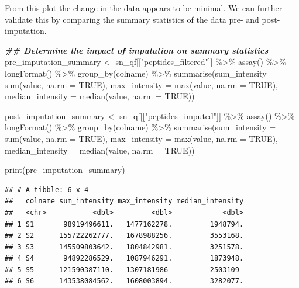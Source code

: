 \documentclass[9pt,a4paper,]{extarticle}
\newenvironment{Shaded}{\begin{snugshade}}{\end{snugshade}}
\newcommand{\AttributeTok}[1]{\textcolor[rgb]{0.77,0.63,0.00}{#1}}
\newcommand{\ConstantTok}[1]{\textcolor[rgb]{0.00,0.00,0.00}{#1}}
\newcommand{\DocumentationTok}[1]{\textcolor[rgb]{0.56,0.35,0.01}{\textbf{\textit{#1}}}}
\newcommand{\FunctionTok}[1]{\textcolor[rgb]{0.00,0.00,0.00}{#1}}
\newcommand{\NormalTok}[1]{#1}
\newcommand{\OtherTok}[1]{\textcolor[rgb]{0.56,0.35,0.01}{#1}}
\newcommand{\SpecialCharTok}[1]{\textcolor[rgb]{0.00,0.00,0.00}{#1}}
\newcommand{\StringTok}[1]{\textcolor[rgb]{0.31,0.60,0.02}{#1}}
\begin{document}
From this plot the change in the data appears to be minimal. We can further
validate this by comparing the summary statistics of the data pre- and post-
imputation.

\begin{Shaded}
\begin{Highlighting}[]
\DocumentationTok{\#\# Determine the impact of imputation on summary statistics}
\NormalTok{pre\_imputation\_summary }\OtherTok{\textless{}{-}}\NormalTok{ sn\_qf[[}\StringTok{"peptides\_filtered"}\NormalTok{]] }\SpecialCharTok{\%\textgreater{}\%}
  \FunctionTok{assay}\NormalTok{() }\SpecialCharTok{\%\textgreater{}\%}
  \FunctionTok{longFormat}\NormalTok{() }\SpecialCharTok{\%\textgreater{}\%}
  \FunctionTok{group\_by}\NormalTok{(colname) }\SpecialCharTok{\%\textgreater{}\%}
  \FunctionTok{summarise}\NormalTok{(}\AttributeTok{sum\_intensity =} \FunctionTok{sum}\NormalTok{(value, }\AttributeTok{na.rm =} \ConstantTok{TRUE}\NormalTok{),}
            \AttributeTok{max\_intensity =} \FunctionTok{max}\NormalTok{(value, }\AttributeTok{na.rm =} \ConstantTok{TRUE}\NormalTok{),}
            \AttributeTok{median\_intensity =} \FunctionTok{median}\NormalTok{(value, }\AttributeTok{na.rm =} \ConstantTok{TRUE}\NormalTok{))}

\NormalTok{post\_imputation\_summary }\OtherTok{\textless{}{-}}\NormalTok{ sn\_qf[[}\StringTok{"peptides\_imputed"}\NormalTok{]] }\SpecialCharTok{\%\textgreater{}\%}
  \FunctionTok{assay}\NormalTok{() }\SpecialCharTok{\%\textgreater{}\%}
  \FunctionTok{longFormat}\NormalTok{() }\SpecialCharTok{\%\textgreater{}\%}
  \FunctionTok{group\_by}\NormalTok{(colname) }\SpecialCharTok{\%\textgreater{}\%}
  \FunctionTok{summarise}\NormalTok{(}\AttributeTok{sum\_intensity =} \FunctionTok{sum}\NormalTok{(value, }\AttributeTok{na.rm =} \ConstantTok{TRUE}\NormalTok{),}
            \AttributeTok{max\_intensity =} \FunctionTok{max}\NormalTok{(value, }\AttributeTok{na.rm =} \ConstantTok{TRUE}\NormalTok{),}
            \AttributeTok{median\_intensity =} \FunctionTok{median}\NormalTok{(value, }\AttributeTok{na.rm =} \ConstantTok{TRUE}\NormalTok{))}

\FunctionTok{print}\NormalTok{(pre\_imputation\_summary)}
\end{Highlighting}
\end{Shaded}

\begin{verbatim}
## # A tibble: 6 x 4
##   colname sum_intensity max_intensity median_intensity
##   <chr>           <dbl>         <dbl>            <dbl>
## 1 S1       98919496611.   1477162278.         1948794.
## 2 S2      155722262777.   1678988256.         3553168.
## 3 S3      145509803642.   1804842981.         3251578.
## 4 S4       94892286529.   1087946291.         1873948.
## 5 S5      121590387110.   1307181986          2503109 
## 6 S6      143538084562.   1608003894.         3282077.
\end{verbatim}
\end{document}
